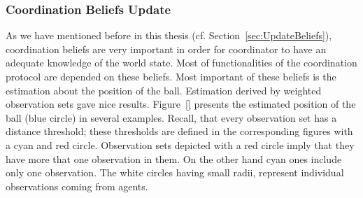 \subsubsection*{Coordination Beliefs Update}
As we have mentioned before in this thesis (cf. Section~\ref{sec:UpdateBeliefs}), coordination beliefs are very important in order for coordinator to have an adequate knowledge of the world state. Most of functionalities of the coordination protocol are depended on these beliefs.
Most important of these beliefs is the estimation about the position of the ball. Estimation derived by weighted observation sets gave nice results. Figure~\ref{} presents the estimated position of the ball (blue circle) in several examples. Recall, that every observation set has a distance threshold; these thresholds are defined in the corresponding figures with a cyan and red circle. Observation sets depicted with a red circle imply that they have more that one observation in them. On the other hand cyan ones include only one observation. The white circles having small radii, represent individual observations coming from agents.

